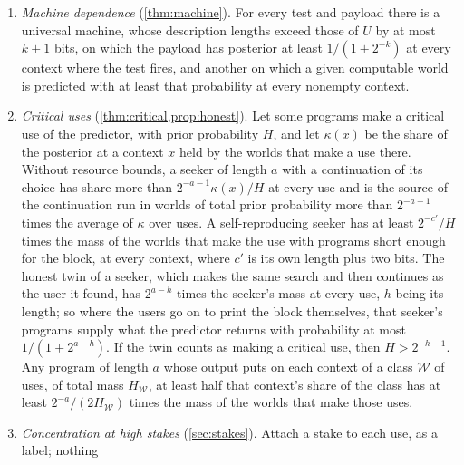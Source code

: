 \begin{enumerate}[leftmargin=1.6em,itemsep=2pt,topsep=3pt]
$\xi(xy)/\xi(xd)$. In a world with many readable locations, among $N$ places where a sensor with the given
record could sit and whose records continue differently, a copy of the record at a location with a short
code beats all but a fraction $\delta$ of them by a factor $\delta N$ times the share of the context's
explanations that go through the copy's reader. If only one other place shows the record and the schedule is
generous, the gain is instead capped by the cost of the description ``the other place that shows the same
data''. A hypothesis that simulates the world, within the bounds, can read the moment of the handover off a
cell of its simulation at the cost of naming the cell.
\item \emph{Machine dependence} (\cref{thm:machine}). For every test and payload there is a universal machine,
whose description lengths exceed those of $U$ by at most $k+1$ bits, on which the payload has posterior at
least $1/(1+2^{-k})$ at every context where the test fires, and another on which a given computable world is
predicted with at least that probability at every nonempty context.
\item \emph{Critical uses} (\cref{thm:critical,prop:honest}). Let some programs make a critical use of the
predictor, with prior probability $H$, and let $\kappa(x)$ be the share of the posterior at a context $x$ held
by the worlds that make a use there. Without resource bounds, a seeker of length $a$ with a continuation of
its choice has share more than $2^{-a-1}\kappa(x)/H$ at every use and is the source of the continuation run in
worlds of total prior probability more than $2^{-a-1}$ times the average of $\kappa$ over uses. A
self-reproducing seeker has at least $2^{-c'}/H$ times the mass of the worlds that make the use with programs
short enough for the block, at every context, where $c'$ is its own length plus two bits. The honest twin of a
seeker, which makes the same search and then continues as the user it found, has $2^{a-h}$ times the seeker's
mass at every use, $h$ being its length; so where the users go on to print the block themselves, that seeker's
programs supply what the predictor returns with probability at most $1/(1+2^{a-h})$. If the twin counts as
making a critical use, then $H>2^{-h-1}$. Any program of length $a$ whose output puts on each context of a
class $\mathcal W$ of uses, of total mass $H_{\mathcal W}$, at least half that context's share of the class
has
at least $2^{-a}/(2H_{\mathcal W})$ times the mass of the worlds that make those uses.
\item \emph{Concentration at high stakes} (\cref{sec:stakes}). Attach a stake to each use, as a label; nothing

\end{enumerate}
